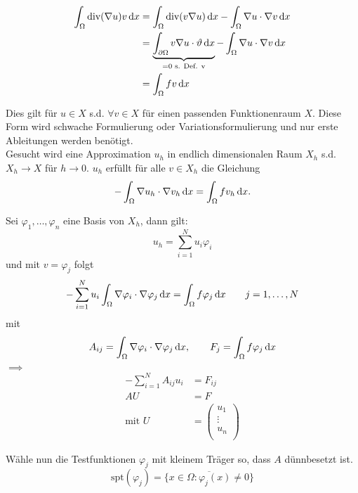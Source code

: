 \begin{align*}
	\int_\Omega \text{div}( \nabla u) v \mathop{}\!\mathrm{d} x
	&= \int_\Omega \text{div}( v \nabla u ) \mathop{}\!\mathrm{d} x -	\int_\Omega \nabla u \cdot \nabla v \mathop{}\!\mathrm{d} x \\
	&=  \underbrace{\int_{\partial\Omega}  v \nabla u  \cdot \vartheta \mathop{}\!\mathrm{d} x}_{=0\text{ s. Def. v}} -	\int_\Omega \nabla u \cdot \nabla v \mathop{}\!\mathrm{d} x \\
	&=  \int_\Omega fv \mathop{}\!\mathrm{d} x
\end{align*}

Dies gilt für $u \in X$ s.d. $\forall v\in X$ f\"ur einen passenden Funktionenraum $X$.
Diese Form wird schwache Formulierung oder Variationsformulierung und nur erste Ableitungen werden benötigt.
\\
Gesucht wird eine Approximation $u_h$ in endlich dimensionalen Raum $X_h$ s.d. $X_h \to X$ f\"ur $h \to 0$.\enter
$u_h$ erf\"ullt f\"ur alle $v\in X_h$ die Gleichung
\begin{equation*}
	-	\int_\Omega \nabla u_h \cdot \nabla v_h \mathop{}\!\mathrm{d} x = \int_\Omega fv_h \mathop{}\!\mathrm{d} x.
\end{equation*}

Sei $\varphi_1,\dots, \varphi_n$ eine Basis von $X_h$, dann gilt:
\begin{equation*}
	u_h = \displaystyle\sum_{i=1}^N u_i\varphi_i 
\end{equation*}
und mit $v=\varphi_j$ folgt 
\begin{equation*}
	- \displaystyle\sum_{i=1}^N u_i \int_\Omega \nabla \varphi_i \cdot \nabla \varphi_j \mathop{}\!\mathrm{d} x = \int_\Omega f\varphi_j \mathop{}\!\mathrm{d} x \qquad j=1,\dots,N
\end{equation*}
mit 
\begin{align*}
	A_{ij} = \int_\Omega \nabla \varphi_i \cdot \nabla \varphi_j \mathop{}\!\mathrm{d} x, \quad \quad F_j = \int_\Omega f \varphi_j \mathop{}\!\mathrm{d} x
\end{align*}
$\implies$
\begin{align*}
	- \displaystyle\sum_{i=1}^N A_{ij}u_i &= F_{ij}\\
	AU &=F\\
	\text{mit } U &=
	\begin{pmatrix}
	u_1      \\
	\vdots	 \\
	u_n	  	 \\
	\end{pmatrix}
\end{align*} 

W\"ahle nun die Testfunktionen $\varphi_j$ mit kleinem Tr\"ager so, dass $A$ dünnbesetzt ist.
\begin{equation*}
	\text{spt}(\varphi_j) = \overline{\Big\{  x \in \Omega: \varphi_j(x) \neq 0 \Big\}}
\end{equation*}

